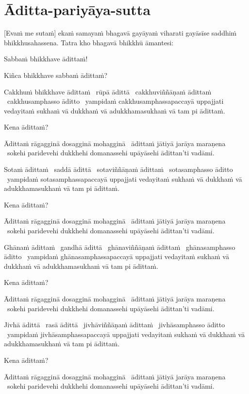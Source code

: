 \section{Āditta-pariyāya-sutta}
\label{aditta-pariyaya}

[Evaṁ me sutaṁ] ekaṁ samayaṁ bhagavā gayāyaṁ viharati gayāsīse saddhiṁ bhikkhusahassena. Tatra kho bhagavā bhikkhū āmantesi:

Sabbaṁ bhikkhave ādittaṁ!

Kiñca bhikkhave sabbaṁ ādittaṁ?

Cakkhuṁ bhikkhave ādittaṁ \breathmark\ rūpā ādittā \breathmark\ cakkhuviññāṇaṁ ādittaṁ \breathmark\ cakkhusamphasso āditto \breathmark\ yampidaṁ cakkhusamphassapaccayā uppajjati vedayitaṁ sukhaṁ vā dukkhaṁ vā adukkhamasukhaṁ vā tam pi ādittaṁ.

Kena ādittaṁ?

Ādittaṁ rāgagginā dosagginā mohagginā \breathmark\ ādittaṁ jātiyā jarāya maraṇena \breathmark\ sokehi paridevehi dukkhehi domanassehi upāyāsehi ādittan’ti vadāmi.

Sotaṁ ādittaṁ \breathmark\ saddā ādittā \breathmark\ sotaviññāṇaṁ ādittaṁ \breathmark\ sotasamphasso āditto \breathmark\ yampidaṁ sotasamphassapaccayā uppajjati vedayitaṁ sukhaṁ vā dukkhaṁ vā adukkhamasukhaṁ vā tam pi ādittaṁ.

Kena ādittaṁ?

Ādittaṁ rāgagginā dosagginā mohagginā \breathmark\ ādittaṁ jātiyā jarāya maraṇena \breathmark\ sokehi paridevehi dukkhehi domanassehi upāyāsehi ādittan’ti vadāmi.

Ghānaṁ ādittaṁ \breathmark\ gandhā ādittā \breathmark\ ghānaviññāṇaṁ ādittaṁ \breathmark\ ghānasamphasso āditto \breathmark\ yampidaṁ ghānasamphassapaccayā uppajjati vedayitaṁ sukhaṁ vā dukkhaṁ vā adukkhamasukhaṁ vā tam pi ādittaṁ.

Kena ādittaṁ?

Ādittaṁ rāgagginā dosagginā mohagginā \breathmark\ ādittaṁ jātiyā jarāya maraṇena \breathmark\ sokehi paridevehi dukkhehi domanassehi upāyāsehi ādittan’ti vadāmi.

Jivhā ādittā \breathmark\ rasā ādittā \breathmark\ jivhāviññāṇaṁ ādittaṁ \breathmark\ jivhāsamphasso āditto \breathmark\ yampidaṁ jivhāsamphassapaccayā uppajjati vedayitaṁ sukhaṁ vā dukkhaṁ vā adukkhamasukhaṁ vā tam pi ādittaṁ.

Kena ādittaṁ?

Ādittaṁ rāgagginā dosagginā mohagginā \breathmark\ ādittaṁ jātiyā jarāya maraṇena \breathmark\ sokehi paridevehi dukkhehi domanassehi upāyāsehi ādittan’ti vadāmi.


